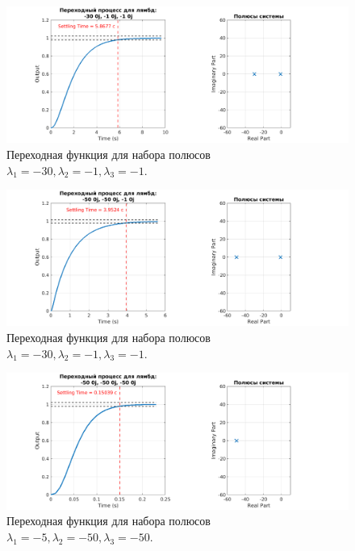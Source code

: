 \begin{figure}
    \centering
    \includegraphics[width=1\textwidth]{figs/task_2_out_3.png}
    \caption{Переходная функция для набора полюсов $\lambda_1 = -30, \lambda_2 = -1, \lambda_3 = -1$.}
    \label{fig:task_2_out_3}
\end{figure}

\begin{figure}
    \centering
    \includegraphics[width=1\textwidth]{figs/task_2_out_4.png}
    \caption{Переходная функция для набора полюсов $\lambda_1 = -30, \lambda_2 = -1, \lambda_3 = -1$.}
    \label{fig:task_2_out_4}
\end{figure}

\begin{figure}
    \centering
    \includegraphics[width=1\textwidth]{figs/task_2_out_5.png}
    \caption{Переходная функция для набора полюсов $\lambda_1 = -5, \lambda_2 = -50, \lambda_3 = -50$.}
    \label{fig:task_2_out_5}
\end{figure}

